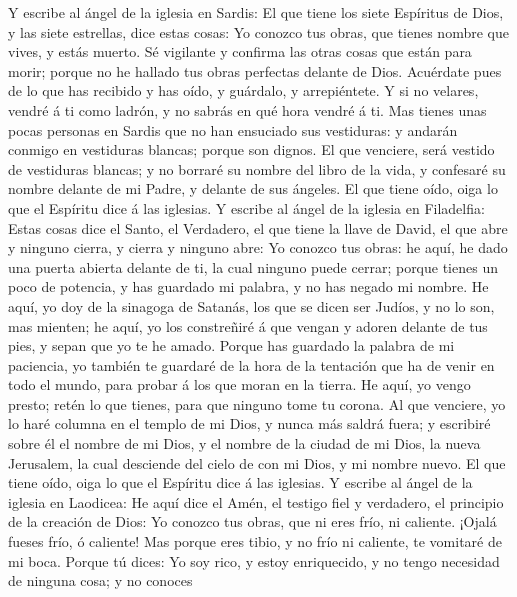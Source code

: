  Y escribe al ángel de la iglesia en Sardis: El que tiene
los siete Espíritus de Dios, y las siete estrellas, dice estas cosas: Yo
conozco tus obras, que tienes nombre que vives, y estás muerto.
 Sé vigilante y confirma las otras cosas que están para
morir; porque no he hallado tus obras perfectas delante de Dios.
 Acuérdate pues de lo que has recibido y has oído, y
guárdalo, y arrepiéntete. Y si no velares, vendré á ti como ladrón, y no
sabrás en qué hora vendré á ti.  Mas tienes unas pocas
personas en Sardis que no han ensuciado sus vestiduras: y andarán
conmigo en vestiduras blancas; porque son dignos.  El que
venciere, será vestido de vestiduras blancas; y no borraré su nombre del
libro de la vida, y confesaré su nombre delante de mi Padre, y delante
de sus ángeles.  El que tiene oído, oiga lo que el
Espíritu dice á las iglesias.  Y escribe al ángel de la
iglesia en Filadelfia: Estas cosas dice el Santo, el Verdadero, el que
tiene la llave de David, el que abre y ninguno cierra, y cierra y
ninguno abre:  Yo conozco tus obras: he aquí, he dado una
puerta abierta delante de ti, la cual ninguno puede cerrar; porque
tienes un poco de potencia, y has guardado mi palabra, y no has negado
mi nombre.  He aquí, yo doy de la sinagoga de Satanás, los
que se dicen ser Judíos, y no lo son, mas mienten; he aquí, yo los
constreñiré á que vengan y adoren delante de tus pies, y sepan que yo te
he amado.  Porque has guardado la palabra de mi
paciencia, yo también te guardaré de la hora de la tentación que ha de
venir en todo el mundo, para probar á los que moran en la tierra.
 He aquí, yo vengo presto; retén lo que tienes, para que
ninguno tome tu corona.  Al que venciere, yo lo haré
columna en el templo de mi Dios, y nunca más saldrá fuera; y escribiré
sobre él el nombre de mi Dios, y el nombre de la ciudad de mi Dios, la
nueva Jerusalem, la cual desciende del cielo de con mi Dios, y mi nombre
nuevo.  El que tiene oído, oiga lo que el Espíritu dice á
las iglesias.  Y escribe al ángel de la iglesia en
Laodicea: He aquí dice el Amén, el testigo fiel y verdadero, el
principio de la creación de Dios:  Yo conozco tus obras,
que ni eres frío, ni caliente. ¡Ojalá fueses frío, ó caliente!
 Mas porque eres tibio, y no frío ni caliente, te
vomitaré de mi boca.  Porque tú dices: Yo soy rico, y
estoy enriquecido, y no tengo necesidad de ninguna cosa; y no conoces
